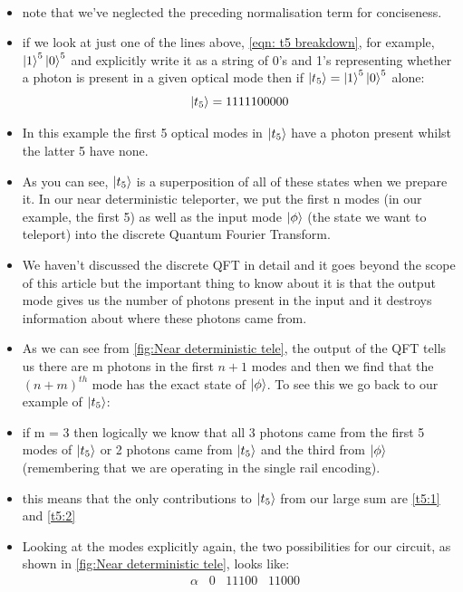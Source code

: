 \begin{itemize}
\begin{align}
 \label{eqn: t5 breakdown}
   \end{align}
    \item note that we've neglected the preceding normalisation term for conciseness. 
    \item if we look at just one of the lines above, \ref{eqn: t5 breakdown}, for example, $\ket{1}^5\ket{0}^5$ and explicitly write it as a string of 0's and 1's representing whether a photon is present in a given optical mode then if $\ket{t_5} = \ket{1}^5\ket{0}^5$ alone:
    \begin{equation}
        \ket{t_5} = 1111100000
    \end{equation}
    \item In this example the first 5 optical modes in $\ket{t_5}$ have a photon present whilst the latter 5 have none.
    \item As you can see, $\ket{t_5}$ is a superposition of all of these states when we prepare it. In our near deterministic teleporter, we put the first n modes (in our example, the first 5) as well as the input mode $\ket{\phi}$ (the state we want to teleport) into the discrete Quantum Fourier Transform.
    \item We haven't discussed the discrete QFT in detail and it goes beyond the scope of this article but the important thing to know about it is that the output mode gives us the number of photons present in the input and it destroys information about where these photons came from. 
    \item As we can see from \ref{fig:Near deterministic tele}, the output of the QFT tells us there are m photons in the first $n+1$ modes and then we find that the $(n+m)^{th}$ mode has the exact state of $\ket{\phi}$. To see this we go back to our example of $\ket{t_5}$:
    \item if m = 3 then logically we know that all 3 photons came from the first 5 modes of $\ket{t_5}$ or 2 photons came from $\ket{t_5}$ and the third from $\ket{\phi}$ (remembering that we are operating in the single rail encoding). 
    \item this means that the only contributions to $\ket{t_5}$ from our large sum are \ref{t5:1} and \ref{t5:2}
    \item Looking at the modes explicitly again, the two possibilities for our circuit, as shown in \ref{fig:Near deterministic tele}, looks like:
    \begin{align} \label{t5 circuit modes}
        &\alpha \;\;\; 0 \;\;\; 11100 \;\;\; 11000 \\

\end{align}
\end{itemize}
